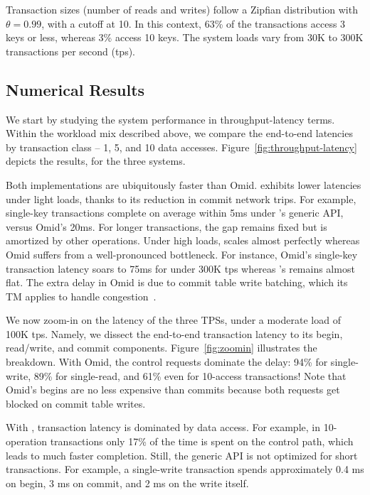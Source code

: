 Transaction sizes (number of reads and writes) follow a Zipfian distribution with $\theta=0.99$, with a cutoff at 10. 
In this context, 63\% of the transactions access 3 keys or less, whereas 3\% access 10 keys. The system loads
vary from 30K to 300K transactions per second (tps). 

\subsection{Numerical Results} 

We start by studying the system performance in throughput-latency terms. 
Within the workload mix described above, we compare the end-to-end latencies by transaction class -- 
1, 5, and 10 data accesses. Figure~\ref{fig:throughput-latency} depicts the results, for the three systems. 

Both {\sys\/} implementations are ubiquitously faster than Omid. {\sys\/} exhibits lower latencies under light loads, 
thanks to its reduction in commit network trips. For example, single-key transactions complete on average within 
5ms under {\sys}'s generic API, versus Omid's 20ms. For longer transactions, the gap remains fixed but is amortized 
by other operations. Under high loads, {\sys\/} scales almost perfectly whereas Omid suffers from a well-pronounced 
bottleneck. For instance, Omid's single-key transaction latency soars to 75ms for under 300K tps whereas
{\sys}'s remains almost flat. The extra delay in Omid is due to commit table write batching, which its TM applies 
to handle congestion~\cite{Omid2017}. %

We now zoom-in on the latency of the three TPSs, under a moderate load of 100K tps. Namely, we dissect the end-to-end 
transaction latency to its begin, read/write, and commit components. Figure~\ref{fig:zoomin} illustrates the breakdown. 
With Omid, the control requests dominate the delay: 94\% for single-write, 89\% for single-read, and 61\%
even for 10-access transactions! Note that Omid's begins are no less expensive than commits because both 
requests get blocked on commit table writes. 

With {\sys\/}, transaction latency is dominated by data access. For example, in 10-operation transactions only 
17\% of the time is spent on the control path, which leads to much faster completion. Still, the generic API is 
not optimized for short transactions. For example, a single-write transaction spends approximately 0.4 ms on 
begin, 3 ms on commit, and 2 ms on the write itself. 

